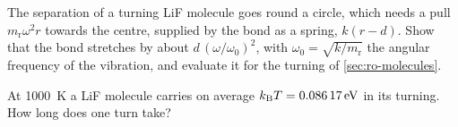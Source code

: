 \begin{exercise}
\label{ex:ro-stretch}
The separation of a turning LiF molecule goes round a circle, which needs a
pull $m_{\mathrm r}\omega^2 r$ towards the centre, supplied by the bond as
a spring, $k(r - d)$. Show that the bond stretches by about $d\,(\omega/
\omega_0)^2$, with $\omega_0 = \sqrt{k/m_{\mathrm r}}$
the angular frequency of the vibration, and evaluate it for the turning of
\cref{sec:ro-molecules}.
\end{exercise}

\begin{exercise}
\label{ex:ro-hot}
At \SI{1000}{\kelvin} a LiF molecule carries on average $k_{\mathrm{B}} T =
\SI{0.08617}{\electronvolt}$ in its turning. How long does one turn take?
\end{exercise}

